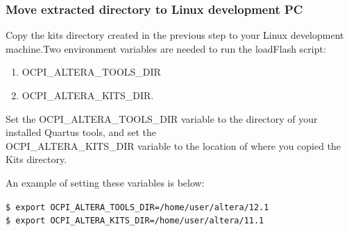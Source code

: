 \documentclass{article}
\newcommand{\shellcmd}[1]{\texttt{\$ #1\\}}
\begin{document}
\subsubsection*{Move extracted directory to Linux development PC}
Copy the kits directory created in the previous step to your Linux development machine.Two environment variables are needed to run the loadFlash script:
\begin{enumerate}
\item OCPI\_ALTERA\_TOOLS\_DIR
\item OCPI\_ALTERA\_KITS\_DIR.
\end{enumerate}
Set the OCPI\_ALTERA\_TOOLS\_DIR variable to the directory of your installed Quartus tools, and set the \\OCPI\_ALTERA\_KITS\_DIR variable to the location of where you copied the Kits directory.\par\smallskip
\noindent An example of setting these variables is below:\par\smallskip
\noindent\shellcmd{export OCPI\_ALTERA\_TOOLS\_DIR=/home/{user}/altera/12.1}
\shellcmd{export OCPI\_ALTERA\_KITS\_DIR=/home/{user}/altera/11.1}
\end{document}
